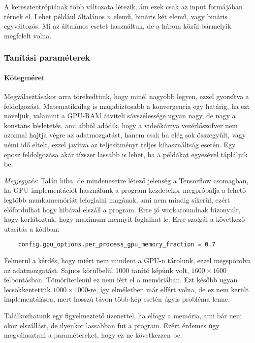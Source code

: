 A keresztentrópiának több változata létezik, ám ezek csak az input formájában térnek
el. Lehet például általános $ n $ elemű, bináris két elemű, vagy bináris egyváltozós.
Mi az általános esetet használtuk, de a három közül bármelyik megfelelt volna.


\subsubsection{Tanítási paraméterek}

\paragraph{Kötegméret}
Megválasztásakor arra törekedtünk, hogy minél nagyobb legyen, ezzel gyorsítva a feldolgozást.
Matematikailag is magabiztosabb a konvergencia egy határig, ha ezt növeljük, 
valamint a GPU-RAM átviteli sávszélessége ugyan nagy, de nagy a konstans késletetés, 
ami abból adódik, hogy a videókártya vezérlőszofver nem azonnal hajtja végre az adatmozgatást,
hanem csak ha elég sok összegyűlt, vagy némi idő eltelt, ezzel javítva az teljesítményt teljes 
kihasználtság esetén. Egy eposz feldolgozása akár tízszer lassabb is lehet, ha a példákat
egyesével tápláljuk be.




\textit{Megjegyzés}: Talán hiba, de mindenesetre létező jelenség a Tensorflow csomagban, ha GPU implementációt használunk a program kezdetekor megpróbálja a lehető legtöbb 
munkamemóriát lefoglalni magának, ami nem mindig sikerül, 
ezért előfordulhat hogy hibával elszáll a program. Erre jó workaroundnak bizonyult, hogy
korlátoztuk, hogy maximum mennyit foglalhat le. Erre szolgál a következő utasítás a kódban:
\begin{lstlisting}
	config.gpu_options.per_process_gpu_memory_fraction = 0.7
\end{lstlisting}


Felmerül a kérdés, hogy miért nem mindent a GPU-n tárolunk, ezzel megspórolva az adatmozgatást.
Sajnos körülbelül 1000 tanító képünk volt, $ 1600 \times 1600 $ felbontásban. 
Tömörítetlenül ez nem fért el a memóriában. Ezt később ugyan lecsökkentettük
$ 1000 \times 1000 $-re, így elméletben már elfért volna, de ez nem került implementálásra,
mert hosszú távon több kép esetén úgyis probléma lenne.



Találkozhatunk egy figyelmeztető üzenettel, ha elfogy a memória, ami bár nem 
okoz elszállást, de ilyenkor lassabban fut a program. Ezért érdemes úgy megválasztani
a paramétereket, hogy ez ne következzen be.


